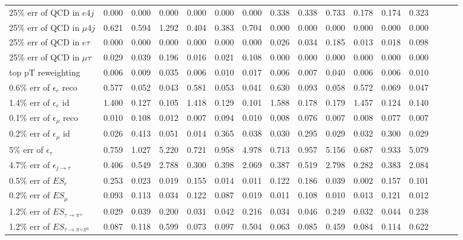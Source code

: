 \begin{sidewaystable}[p]
\begin{tabular}{|l|ccc|ccc|ccc|ccc|ccc|}
  25$\%$ err of QCD in $e 4j$                & 0.000 & 0.000 & 0.000 & 0.000 & 0.000 & 0.000 & 0.338 & 0.338 & 0.733 & 0.178 & 0.174 & 0.323 \\ 
  25$\%$ err of QCD in $\mu 4j$              & 0.621 & 0.594 & 1.292 & 0.404 & 0.383 & 0.704 & 0.000 & 0.000 & 0.000 & 0.000 & 0.000 & 0.000 \\ 
  25$\%$ err of QCD in $e\tau$               & 0.000 & 0.000 & 0.000 & 0.000 & 0.000 & 0.000 & 0.026 & 0.034 & 0.185 & 0.013 & 0.018 & 0.098 \\ 
  25$\%$ err of QCD in $\mu\tau$             & 0.029 & 0.039 & 0.196 & 0.016 & 0.021 & 0.108 & 0.000 & 0.000 & 0.000 & 0.000 & 0.000 & 0.000 \\ 
  top pT reweighting                         & 0.006 & 0.009 & 0.035 & 0.006 & 0.010 & 0.017 & 0.006 & 0.007 & 0.040 & 0.006 & 0.006 & 0.010 \\ 
  0.6$\%$ err of $\epsilon_e$ reco           & 0.577 & 0.052 & 0.043 & 0.581 & 0.053 & 0.041 & 0.630 & 0.093 & 0.058 & 0.572 & 0.069 & 0.047 \\ 
  1.4$\%$ err of $\epsilon_e$ id             & 1.400 & 0.127 & 0.105 & 1.418 & 0.129 & 0.101 & 1.588 & 0.178 & 0.179 & 1.457 & 0.124 & 0.140 \\ 
  0.1$\%$ err of $\epsilon_\mu$ reco         & 0.010 & 0.108 & 0.012 & 0.007 & 0.094 & 0.010 & 0.008 & 0.076 & 0.007 & 0.008 & 0.077 & 0.007 \\ 
  0.2$\%$ err of $\epsilon_\mu$ id           & 0.026 & 0.413 & 0.051 & 0.014 & 0.365 & 0.038 & 0.030 & 0.295 & 0.029 & 0.032 & 0.300 & 0.029 \\ 
  5$\%$ err of $\epsilon_\tau$               & 0.759 & 1.027 & 5.220 & 0.721 & 0.958 & 4.978 & 0.713 & 0.957 & 5.156 & 0.687 & 0.933 & 5.079 \\ 
  4.7$\%$ err of $\epsilon_{j\to\tau}$       & 0.406 & 0.549 & 2.788 & 0.300 & 0.398 & 2.069 & 0.387 & 0.519 & 2.798 & 0.282 & 0.383 & 2.084 \\ 
  0.5$\%$ err of $ES_{e}$                    & 0.253 & 0.023 & 0.019 & 0.155 & 0.014 & 0.011 & 0.122 & 0.186 & 0.039 & 0.002 & 0.157 & 0.101 \\ 
  0.2$\%$ err of $ES_{\mu}$                  & 0.093 & 0.113 & 0.034 & 0.122 & 0.087 & 0.019 & 0.011 & 0.108 & 0.010 & 0.013 & 0.121 & 0.012 \\ 
  1.2$\%$ err of $ES_{\tau\to\pi^\pm}$       & 0.029 & 0.039 & 0.200 & 0.031 & 0.042 & 0.216 & 0.034 & 0.046 & 0.249 & 0.032 & 0.044 & 0.238 \\ 
  1.2$\%$ err of $ES_{\tau\to\pi^\pm\pi^0}$  & 0.087 & 0.118 & 0.599 & 0.073 & 0.097 & 0.504 & 0.063 & 0.085 & 0.459 & 0.084 & 0.114 & 0.622 \\ 

\end{tabular}
\end{sidewaystable}
